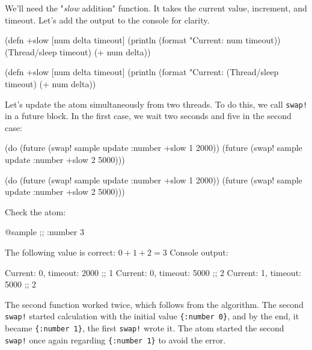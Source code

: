 We'll need the "\emph{slow} addition" function.
It takes the current value, increment, and timeout.
Let's add the output to the console for clarity.

\ifx\DEVICETYPE\MOBILE

\begin{clojure}
(defn +slow
  [num delta timeout]
  (println
    (format "Current: %
      num timeout))
  (Thread/sleep timeout)
  (+ num delta))
\end{clojure}

\else

\begin{clojure}
(defn +slow
  [num delta timeout]
  (println (format "Current: %
  (Thread/sleep timeout)
  (+ num delta))
\end{clojure}

\fi


Let's update the atom simultaneously from two threads. To do this, we call \verb|swap!| in a future block. In the first case, we wait two seconds and five in the second case:

\ifx\DEVICETYPE\MOBILE

\begin{clojure}
(do (future (swap! sample update
              :number +slow 1 2000))
    (future (swap! sample update
              :number +slow 2 5000)))
\end{clojure}

\else

\begin{clojure}
(do (future (swap! sample update :number +slow 1 2000))
    (future (swap! sample update :number +slow 2 5000)))
\end{clojure}

\fi

\noindent
Check the atom:

\begin{clojure}
@sample ;; {:number 3}
\end{clojure}

\noindent
The following value is correct: $0 + 1 + 2 = 3$
Console output:

\begin{text}
Current: 0, timeout: 2000 ;; 1
Current: 0, timeout: 5000 ;; 2
Current: 1, timeout: 5000 ;; 2
\end{text}

The second function worked twice, which follows from the algorithm.
The second \verb|swap!| started calculation with the initial value \verb|{:number 0}|, and by the end, it became \verb|{:number 1}|, the first \verb|swap!| wrote it.
The atom started the second \verb|swap!| once again regarding \verb|{:number 1}| to avoid the error.

